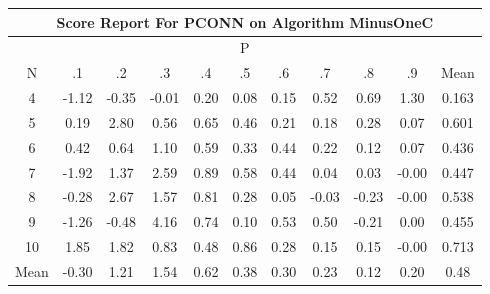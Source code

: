 \documentclass[11pt,a4paper]{report}
\begin{document}
\begin{longtable}{ | c || c | c | c | c | c | c | c | c | c || c |}
\hline
\multicolumn{11}{|c|}{ Score Report For PCONN on Algorithm MinusOneC} \\
\hline
\multicolumn{11}{|c|}{ P } \\
\hline
N & .1 & .2 & .3 & .4 & .5 & .6 & .7 & .8 & .9 & Mean\\
 \hline
 \hline
 \endhead
  4 &  \cellcolor[HTML]{FFDFDF} -1.12 &  \cellcolor[HTML]{FFF7F7} -0.35 &  \cellcolor[HTML]{FFFFFF} -0.01 &  \cellcolor[HTML]{F7F7FF} 0.20 &  \cellcolor[HTML]{FFFFFF} 0.08 &  \cellcolor[HTML]{FFFFFF} 0.15 &  \cellcolor[HTML]{EFEFFF} 0.52 &  \cellcolor[HTML]{EFEFFF} 0.69 &  \cellcolor[HTML]{DFDFFF} 1.30 & 0.163 \\
  5 &  \cellcolor[HTML]{F7F7FF} 0.19 &  \cellcolor[HTML]{B7B7FF} 2.80 &  \cellcolor[HTML]{EFEFFF} 0.56 &  \cellcolor[HTML]{EFEFFF} 0.65 &  \cellcolor[HTML]{F7F7FF} 0.46 &  \cellcolor[HTML]{F7F7FF} 0.21 &  \cellcolor[HTML]{F7F7FF} 0.18 &  \cellcolor[HTML]{F7F7FF} 0.28 &  \cellcolor[HTML]{FFFFFF} 0.07 & 0.601 \\
  6 &  \cellcolor[HTML]{F7F7FF} 0.42 &  \cellcolor[HTML]{EFEFFF} 0.64 &  \cellcolor[HTML]{E7E7FF} 1.10 &  \cellcolor[HTML]{EFEFFF} 0.59 &  \cellcolor[HTML]{F7F7FF} 0.33 &  \cellcolor[HTML]{F7F7FF} 0.44 &  \cellcolor[HTML]{F7F7FF} 0.22 &  \cellcolor[HTML]{FFFFFF} 0.12 &  \cellcolor[HTML]{FFFFFF} 0.07 & 0.436 \\
  7 &  \cellcolor[HTML]{FFCFCF} -1.92 &  \cellcolor[HTML]{DFDFFF} 1.37 &  \cellcolor[HTML]{BFBFFF} 2.59 &  \cellcolor[HTML]{E7E7FF} 0.89 &  \cellcolor[HTML]{EFEFFF} 0.58 &  \cellcolor[HTML]{F7F7FF} 0.44 &  \cellcolor[HTML]{FFFFFF} 0.04 &  \cellcolor[HTML]{FFFFFF} 0.03 &  \cellcolor[HTML]{FFFFFF} -0.00 & 0.447 \\
  8 &  \cellcolor[HTML]{FFF7F7} -0.28 &  \cellcolor[HTML]{BFBFFF} 2.67 &  \cellcolor[HTML]{D7D7FF} 1.57 &  \cellcolor[HTML]{E7E7FF} 0.81 &  \cellcolor[HTML]{F7F7FF} 0.28 &  \cellcolor[HTML]{FFFFFF} 0.05 &  \cellcolor[HTML]{FFFFFF} -0.03 &  \cellcolor[HTML]{FFF7F7} -0.23 &  \cellcolor[HTML]{FFFFFF} -0.00 & 0.538 \\
  9 &  \cellcolor[HTML]{FFDFDF} -1.26 &  \cellcolor[HTML]{FFEFEF} -0.48 &  \cellcolor[HTML]{9797FF} 4.16 &  \cellcolor[HTML]{EFEFFF} 0.74 &  \cellcolor[HTML]{FFFFFF} 0.10 &  \cellcolor[HTML]{EFEFFF} 0.53 &  \cellcolor[HTML]{EFEFFF} 0.50 &  \cellcolor[HTML]{FFF7F7} -0.21 &  \cellcolor[HTML]{FFFFFF} 0.00 & 0.455 \\
  10 &  \cellcolor[HTML]{CFCFFF} 1.85 &  \cellcolor[HTML]{CFCFFF} 1.82 &  \cellcolor[HTML]{E7E7FF} 0.83 &  \cellcolor[HTML]{EFEFFF} 0.48 &  \cellcolor[HTML]{E7E7FF} 0.86 &  \cellcolor[HTML]{F7F7FF} 0.28 &  \cellcolor[HTML]{FFFFFF} 0.15 &  \cellcolor[HTML]{FFFFFF} 0.15 &  \cellcolor[HTML]{FFFFFF} -0.00 & 0.713 \\
 \hline
 \hline
Mean &  \cellcolor[HTML]{FFF7F7} -0.30 &  \cellcolor[HTML]{DFDFFF} 1.21 &  \cellcolor[HTML]{D7D7FF} 1.54 &  \cellcolor[HTML]{EFEFFF} 0.62 &  \cellcolor[HTML]{F7F7FF} 0.38 &  \cellcolor[HTML]{F7F7FF} 0.30 &  \cellcolor[HTML]{F7F7FF} 0.23 &  \cellcolor[HTML]{FFFFFF} 0.12 &  \cellcolor[HTML]{F7F7FF} 0.20 &  \cellcolor[HTML]{EFEFFF} 0.48
\end{longtable}
\end{document}
